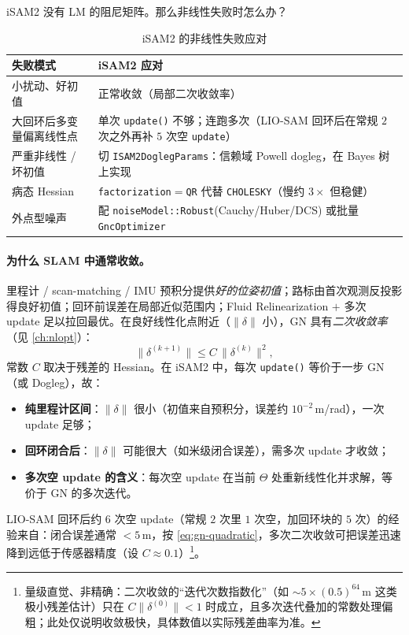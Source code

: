 iSAM2 没有 LM 的阻尼矩阵。那么非线性失败时怎么办？

\begin{table}[H]\centering\small
\caption{iSAM2 的非线性失败应对}
\label{tab:isam-failure}
\begin{tabular}{ll}
\toprule
失败模式 & iSAM2 应对 \\
\midrule
小扰动、好初值 & 正常收敛（局部二次收敛率） \\
大回环后多变量偏离线性点 & 单次 \texttt{update()} 不够；连跑多次（LIO-SAM 回环后在常规 $2$ 次之外再补 $5$ 次空 \texttt{update}） \\
严重非线性 / 坏初值 & 切 \texttt{ISAM2DoglegParams}：信赖域 Powell dogleg\cite{rosen2014rise}，在 Bayes 树上实现 \\
病态 Hessian & \texttt{factorization}$=$\texttt{QR} 代替 \texttt{CHOLESKY}（慢约 $3\times$ 但稳健） \\
外点型噪声 & 配 \texttt{noiseModel::Robust}(Cauchy/Huber/DCS) 或批量 \texttt{GncOptimizer} \\
\bottomrule
\end{tabular}
\end{table}

\paragraph{为什么 SLAM 中通常收敛。}
里程计 / scan-matching / IMU 预积分提供\emph{好的位姿初值}；路标由首次观测反投影得良好初值；回环前误差在局部近似范围内；Fluid Relinearization $+$ 多次 update 足以拉回最优。在良好线性化点附近（$\|\delta\|$ 小），GN 具有\emph{二次收敛率}（见 \cref{ch:nlopt}）：
\begin{equation}
  \|\delta^{(k+1)}\|\le C\,\|\delta^{(k)}\|^2,
  \label{eq:gn-quadratic}
\end{equation}
常数 $C$ 取决于残差的 Hessian。在 iSAM2 中，每次 \texttt{update()} 等价于一步 GN（或 Dogleg），故：
\begin{itemize}
  \item \textbf{纯里程计区间}：$\|\delta\|$ 很小（初值来自预积分，误差约 $10^{-2}$\,m/rad），一次 update 足够；
  \item \textbf{回环闭合后}：$\|\delta\|$ 可能很大（如米级闭合误差），需多次 update 才收敛；
  \item \textbf{多次空 update 的含义}：每次空 update 在当前 $\Theta$ 处重新线性化并求解，等价于 GN 的多次迭代。
\end{itemize}
LIO-SAM 回环后约 $6$ 次空 update（常规 $2$ 次里 $1$ 次空，加回环块的 $5$ 次）的经验来自：闭合误差通常 $<5$\,m，按 \cref{eq:gn-quadratic}，多次二次收敛可把误差迅速降到远低于传感器精度（设 $C\approx 0.1$）\footnote{量级直觉、非精确：二次收敛的“迭代次数指数化”（如 $\sim\!5\times(0.5)^{64}$\,m 这类极小残差估计）只在 $C\|\delta^{(0)}\|<1$ 时成立，且多次迭代叠加的常数处理偏粗；此处仅说明收敛极快，具体数值以实际残差曲率为准。}。

